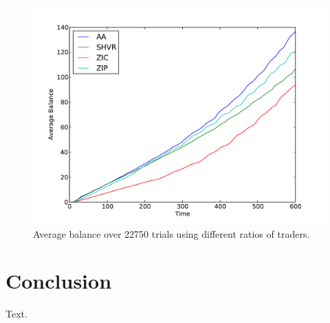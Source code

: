 \documentclass[preprint]{acm_proc_article-sp} %
\begin{document}
\begin{figure} 
\centering
\includegraphics[width=\columnwidth]{graphs_and_stats/graph_average_balance_vs_time.pdf}
\caption{Average balance over 22750 trials using different ratios of traders.}
\end{figure}


\section{Conclusion} \label{sec:conclusion}
Text.\\


\pagebreak


\end{document}
